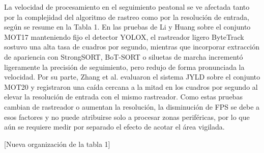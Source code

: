 \documentclass[runningheads]{llncs}
\begin{document}
La velocidad de procesamiento en el seguimiento peatonal se ve afectada tanto por la complejidad del algoritmo de rastreo como por la resolución de entrada, según se resume en la Tabla 1. En las pruebas de Li y Huang \cite{li2024} sobre el conjunto MOT17 manteniendo fijo el detector YOLOX, el rastreador ligero ByteTrack sostuvo una alta tasa de cuadros por segundo, mientras que incorporar extracción de apariencia con StrongSORT, BoT-SORT o siluetas de marcha incrementó ligeramente la precisión de seguimiento, pero redujo de forma pronunciada la velocidad. Por su parte, Zhang et al. \cite{zhang2023} evaluaron el sistema JYLD sobre el conjunto MOT20 y registraron una caída cercana a la mitad en los cuadros por segundo al elevar la resolución de entrada con el mismo rastreador. Como estas pruebas cambian de rastreador o aumentan la resolución, la disminución de FPS se debe a esos factores y no puede atribuirse solo a procesar zonas periféricas, por lo que aún se requiere medir por separado el efecto de acotar el área vigilada.


[Nueva organización de la tabla 1]
\end{document}
